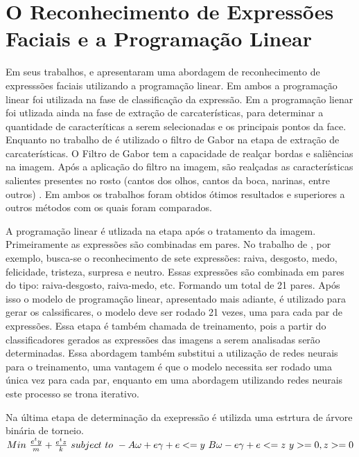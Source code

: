 \section{O Reconhecimento de Expressões Faciais e a Programação Linear}

Em seus trabalhos,  e  apresentaram uma abordagem de reconhecimento de expresssões faciais utilizando a programação linear. Em ambos a programação linear foi utilizada na fase de classificação da expressão. Em  a programação lienar foi utlizada ainda na fase de extração de carcaterísticas, para determinar a quantidade de caracteríticas a serem selecionadas e os principais pontos da face. Enquanto no trabalho de \cite{Feng} é utilizado o filtro de Gabor na etapa de extração de carcaterísticas. O Filtro de Gabor tem a capacidade de realçar bordas e saliências na imagem. Após a aplicação do filtro na imagem, são realçadas as características salientes presentes no rosto (cantos dos olhos, cantos da boca, narinas, entre outros) \cite{Gabor}. Em ambos os trabalhos foram obtidos ótimos resultados e superiores a outros métodos com os quais foram comparados. 

A programação linear é utlizada na etapa após o tratamento da imagem. Primeiramente as expressões são combinadas em pares. No trabalho de \cite{Feng}, por exemplo, busca-se o reconhecimento de sete expressões: raiva, desgosto, medo, felicidade, tristeza, surpresa e neutro. Essas expressões são combinada em pares do tipo: raiva-desgosto, raiva-medo, etc. Formando um total de 21 pares. Após isso o modelo de programação linear, apresentado mais adiante, é utilizado para gerar os calssificares, o modelo deve ser rodado 21 vezes, uma para cada par de expressões. Essa etapa é também chamada de treinamento, pois a partir do classificadores gerados as expressões das imagens a serem analisadas serão determinadas. Essa abordagem também substitui a utilização de redes neurais para o treinamento, uma vantagem é que o modelo necessita ser rodado uma única vez para cada par, enquanto em uma abordagem utilizando redes neurais este processo se trona iterativo.

Na última etapa de determinação da exepressão é utilizda uma estrtura de árvore binária de torneio.
$Min\ \frac{e^{t}y}{m} + \frac{e^{t}z}{k}\\
\ subject\ to  \\
\              -A\omega + e\gamma + e <= y\\
\              B\omega - e\gamma + e <= z\\
\              y>= 0, z>= 0 $

